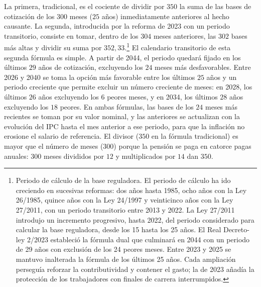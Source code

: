 \documentclass[10pt,a4paper]{article}
\begin{document}
La primera, tradicional, es el cociente de dividir por $350$ la suma de las bases de cotización de los $300$ meses ($25$ años) inmediatamente anteriores al hecho causante. La segunda, introducida por la reforma de 2023 con un periodo transitorio, consiste en tomar, dentro de los $304$ meses anteriores, las $302$ bases más altas y dividir su suma por $352,33$.\footnote{Periodo de cálculo de la base reguladora. El periodo de cálculo ha ido creciendo en sucesivas reformas: dos años hasta 1985, ocho años con la Ley 26/1985, quince años con la Ley 24/1997 y veinticinco años con la Ley 27/2011, con un periodo transitorio entre 2013 y 2022. La Ley 27/2011 introdujo un incremento progresivo, hasta 2022, del periodo considerado para calcular la base reguladora, desde los 15 hasta los 25 años. El Real Decreto-ley 2/2023 estableció la fórmula dual que culminará en 2044 con un periodo de 29 años con exclusión de los 24 peores meses. Entre 2023 y 2025 se mantuvo inalterada la fórmula de los últimos 25 años. Cada ampliación perseguía reforzar la contributividad y contener el gasto; la de 2023 añadía la protección de los trabajadores con finales de carrera interrumpidos.
} El calendario transitorio de esta segunda fórmula es simple. A partir de 2044, el periodo quedará fijado en los últimos $29$ años de cotización, excluyendo los $24$ meses más desfavorables. Entre 2026 y 2040 se toma la opción más favorable entre los últimos $25$ años y un periodo creciente que permite excluir un número creciente de meses: en 2028, los últimos $26$ años excluyendo los $6$ peores meses, y en 2034, los últimos $28$ años excluyendo los $18$ peores. En ambas fórmulas, las bases de los $24$ meses más recientes se toman por su valor nominal, y las anteriores se actualizan con la evolución del IPC hasta el mes anterior a ese periodo, para que la inflación no erosione el salario de referencia. El divisor ($350$ en la fórmula tradicional) es mayor que el número de meses ($300$) porque la pensión se paga en catorce pagas anuales: $300$ meses divididos por $12$ y multiplicados por $14$ dan $350$.
\end{document}
